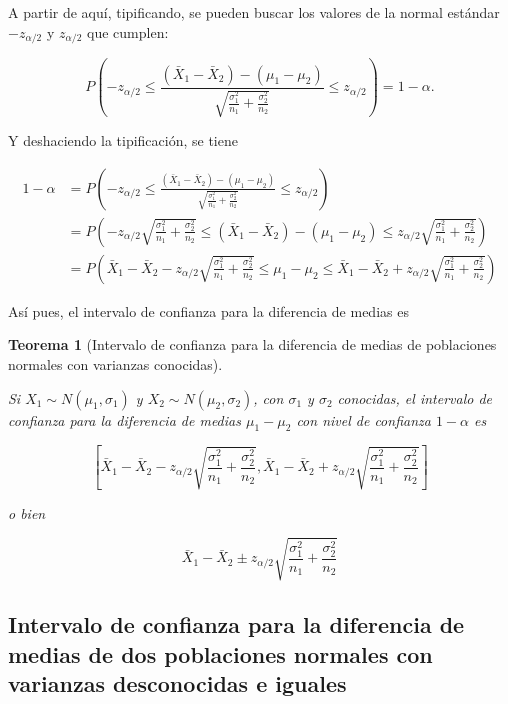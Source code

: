 \documentclass[
  a4paper,
]{scrreport}
\theoremstyle{plain}
\newtheorem{theorem}{Teorema}[chapter]
\theoremstyle{definition}
\theoremstyle{definition}
\theoremstyle{remark}
\begin{document}
A partir de aquí, tipificando, se pueden buscar los valores de la normal
estándar \(-z_{\alpha/2}\) y \(z_{\alpha/2}\) que cumplen:

\[
P\left(-z_{\alpha/2}\leq \frac{(\bar{X}_1-\bar{X}_2)-(\mu_1-\mu_2)}{\sqrt{\frac{\sigma^2_1}{n_1}+\frac{\sigma^2_2}{n_2}}} \leq z_{\alpha/2}\right) = 1-\alpha.
\]

Y deshaciendo la tipificación, se tiene

\begin{align*}
1-\alpha 
&= P\left(-z_{\alpha/2}\leq \frac{(\bar{X}_1-\bar{X}_2)-(\mu_1-\mu_2)}{\sqrt{\frac{\sigma^2_1}{n_1}+\frac{\sigma^2_2}{n_2}}} \leq z_{\alpha/2}\right) \\
&= P\left(-z_{\alpha/2}\sqrt{\frac{\sigma^2_1}{n_1}+\frac{\sigma^2_2}{n_2}}\leq (\bar{X}_1-\bar{X}_2)-(\mu_1-\mu_2)\leq z_{\alpha/2}\sqrt{\frac{\sigma^2_1}{n_1}+\frac{\sigma^2_2}{n_2}}\right) \\
&= P\left(\bar{X}_1-\bar{X}_2 - z_{\alpha/2}\sqrt{\frac{\sigma^2_1}{n_1}+\frac{\sigma^2_2}{n_2}}\leq \mu_1-\mu_2\leq \bar{X}_1-\bar{X}_2 + z_{\alpha/2}\sqrt{\frac{\sigma^2_1}{n_1}+\frac{\sigma^2_2}{n_2}}\right)
\end{align*}

Así pues, el intervalo de confianza para la diferencia de medias es

\begin{theorem}[Intervalo de confianza para la diferencia de medias de
poblaciones normales con varianzas
conocidas]\protect\hypertarget{thm-intervalo-confianza-diferencia-medias-normales-varianzas-conocidas}{}\label{thm-intervalo-confianza-diferencia-medias-normales-varianzas-conocidas}

Si \(X_1\sim N(\mu_1,\sigma_1)\) y \(X_2\sim N(\mu_2,\sigma_2)\), con
\(\sigma_1\) y \(\sigma_2\) conocidas, el \emph{intervalo de confianza
para la diferencia de medias} \(\mu_1-\mu_2\) con nivel de confianza
\(1-\alpha\) es

\[
\left[\bar{X}_1-\bar{X}_2-z_{\alpha/2}\sqrt{\frac{\sigma^2_1}{n_1}+\frac{\sigma^2_2}{n_2}},\bar{X}_1-\bar{X}_2+z_{\alpha/2}\sqrt{\frac{\sigma^2_1}{n_1}+\frac{\sigma^2_2}{n_2}}\right]
\]

o bien

\[
\bar{X}_1-\bar{X}_2\pm z_{\alpha/2}\sqrt{\frac{\sigma^2_1}{n_1}+\frac{\sigma^2_2}{n_2}}
\]

\end{theorem}

\subsection{Intervalo de confianza para la diferencia de medias de dos
poblaciones normales con varianzas desconocidas e
iguales}\label{intervalo-de-confianza-para-la-diferencia-de-medias-de-dos-poblaciones-normales-con-varianzas-desconocidas-e-iguales}
\end{document}
